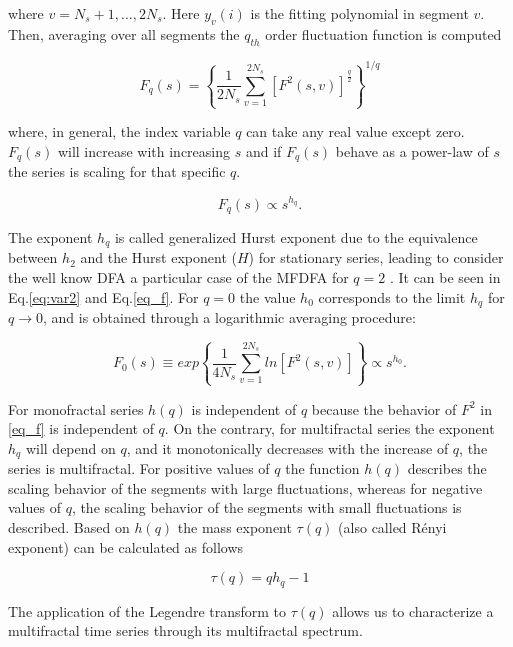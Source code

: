 \documentclass[onecolumn, preprint,aps,amsmath, amssymb, superscriptaddress]{revtex4}
\begin{document}
where $v=N_s+1,\ldots,2N_s$. Here $y_v (i)$  is the fitting polynomial in segment $v$. \\
Then, averaging over all segments the $q_{th}$ order fluctuation function is computed

\begin{equation}
F_q (s)=\left\lbrace \frac{1}{2N_s} \sum_{v=1}^{2N_s}[F^2 (s,v)]^{\frac{q}{2}}\right\rbrace ^{1/q}
\label{eq_f}  
\end{equation}

where, in general, the index variable $q$ can take any real value except zero. $F_q (s)$ will increase with increasing $s$ and if $F_q (s)$  behave as a power-law of $s$ the series is scaling for that specific $q$.


\begin{equation}
F_q (s) \propto s^{h_q}.
\end{equation}

The exponent $h_q$ is called generalized Hurst exponent due to the equivalence between $h_2$ and the Hurst exponent ($H$) for stationary series, leading to consider the well know DFA \cite{Peng} a particular case of the MFDFA for $q=2$ \cite{Kantelhardt_2, Zhang}. It can be seen  in Eq.\ref{eq:var2} and Eq.\ref{eq_f}. For $q=0$ the value $h_0$ corresponds to the limit $h_q$ for $q \rightarrow 0$, and is obtained through a logarithmic averaging procedure:

\begin{equation}
F_0(s) \equiv exp \left\lbrace \frac{1}{4N_s} \sum_{v=1}^{2N_s} ln[F^2 (s,v)]\right\rbrace  \propto s^{h_0}.
\end{equation}

For monofractal series $h(q)$ is independent of $q$ because the behavior of $F^2$ in \ref{eq_f} is independent of $q$. On the contrary, for multifractal series the exponent $h_q$ will depend on $q$, and it monotonically decreases with the increase of $q$, the series is multifractal. For positive values of $q$ the function $h(q)$ describes the scaling behavior of the segments with large fluctuations, whereas for negative values of $q$, the scaling behavior of the segments with small fluctuations is described. Based on $h(q)$ the mass exponent $\tau(q)$ (also called R\'enyi exponent) can be calculated as follows

\begin{equation}
\tau(q)=qh_q-1
\label{eq:Reny}
\end{equation}

The application of the Legendre transform to $\tau(q)$ allows us to characterize a multifractal time series through its multifractal spectrum.
\end{document}

